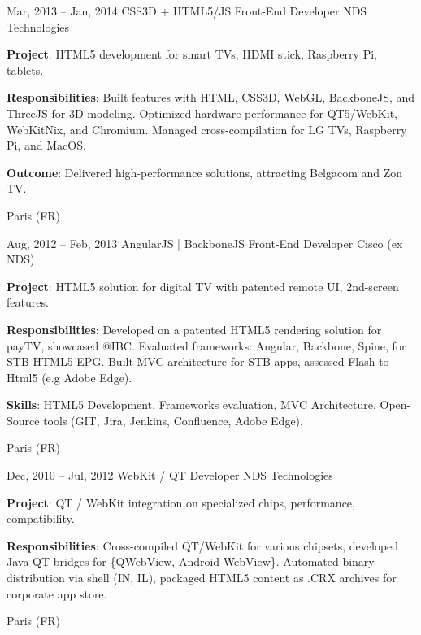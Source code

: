 \documentclass[
  a4paper,
   maincolor=cvblue,
   sectioncolor=cvblue,
   sidebarwidth=0.323\paperwidth,
]{fortysecondscv}
\begin{document}
\begin{cvtableNew}
  \cvitemRightNew
    {Mar, 2013 – Jan, 2014} %
    {CSS3D + HTML5/JS Front-End Developer} %
    {NDS Technologies} %
    {
      \vspace{1pt}
      \textbf{Project}: HTML5 development for smart TVs, HDMI stick, Raspberry Pi, tablets.\par
      \vspace{4pt}
      \textbf{Responsibilities}: Built features with HTML, CSS3D, WebGL, BackboneJS, and ThreeJS for 3D modeling. Optimized hardware performance for QT5/WebKit, WebKitNix, and Chromium. Managed cross-compilation for LG TVs, Raspberry Pi, and MacOS.\par
      \vspace{4pt}
      \textbf{Outcome}: Delivered high-performance solutions, attracting Belgacom and Zon TV.\par
    }
    {Paris (FR)} %
\end{cvtableNew}





\begin{cvtableNew}
  \cvitemRightNew
    {Aug, 2012 – Feb, 2013} %
    {AngularJS | BackboneJS Front-End Developer} %
    {Cisco (ex NDS)} %
    {
      \vspace{1pt}
      \textbf{Project}: HTML5 solution for digital TV with patented remote UI, 2nd-screen features.\par
      \vspace{4pt}
      \textbf{Responsibilities}: Developed on a patented HTML5 rendering solution for payTV, showcased @IBC. Evaluated frameworks: Angular, Backbone, Spine, for STB HTML5 EPG. Built MVC architecture for STB apps, assessed Flash-to-Html5 (e.g Adobe Edge).\par
      \vspace{4pt}
      \textbf{Skills}: HTML5 Development, Frameworks evaluation, MVC Architecture, Open-Source tools (GIT, Jira, Jenkins, Confluence, Adobe Edge).\par
    }
    {Paris (FR)} %
\end{cvtableNew}



\begin{cvtableNew}
  \cvitemRightNew
    {Dec, 2010 – Jul, 2012} %
    {WebKit / QT Developer} %
    {NDS Technologies} %
    {
      \vspace{1pt}
      \textbf{Project}: QT / WebKit integration on specialized chips, performance, compatibility.\par
      \vspace{4pt}
      \textbf{Responsibilities}: Cross-compiled QT/WebKit for various chipsets, developed Java-QT bridges for \{QWebView, Android WebView\}. Automated binary distribution via shell (IN, IL), packaged HTML5 content as .CRX archives for corporate app store.\par
    }
    {Paris (FR)} %
\end{cvtableNew}
\end{document}
